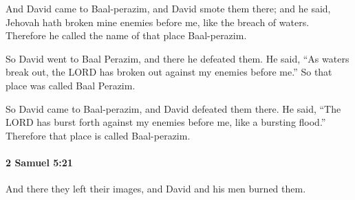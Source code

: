 			\begin{versebox}
					\item[BHS] 
					\item[ASV] And David came to Baal-perazim, and David smote them there; and he said, Jehovah hath broken mine enemies before me, like the breach of waters. Therefore he called the name of that place Baal-perazim.
					\item[NIV] So David went to Baal Perazim, and there he defeated them. He said, “As waters break out, the LORD has broken out against my enemies before me.” So that place was called Baal Perazim.
					\item[NRSV] So David came to Baal-perazim, and David defeated them there. He said, “The LORD has burst forth against my enemies before me, like a bursting flood.” Therefore that place is called Baal-perazim.
			\end{versebox}

		\paragraph{2 Samuel 5:21} %
			\label{2SAMUEL-5-21}

			And there they left their images, and David and his men burned them.


